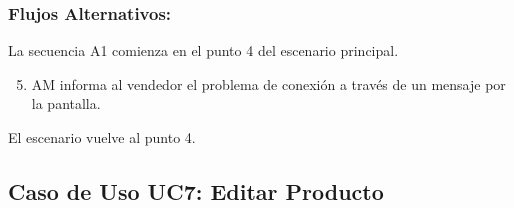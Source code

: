 \begin{framed}
\subsubsection{Flujos Alternativos: }

La secuencia A1 comienza en el punto 4 del escenario principal.
\begin{enumerate}
    \setcounter{enumi}{4}
    \item AM informa al vendedor el problema de conexión a través de un mensaje por la pantalla.
\end{enumerate}
El escenario vuelve al punto 4.

\end{framed}



\subsection{Caso de Uso UC7: Editar Producto}

